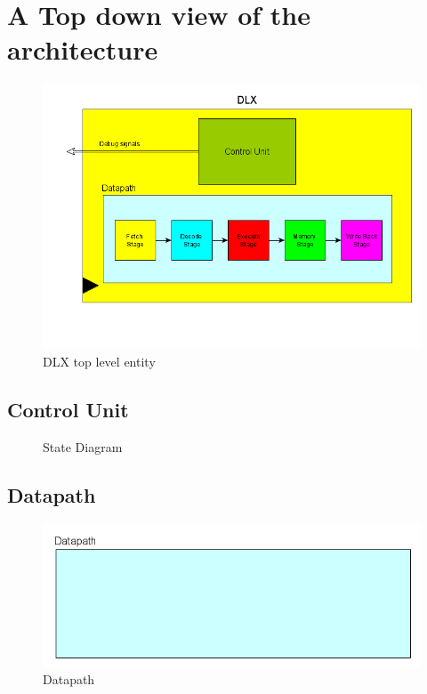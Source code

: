 \chapter{A Top down view of the architecture}
\label{architecure}




\begin{figure}[!htbp]
\centering
\captionsetup{justification=centering}
\includegraphics[scale=0.4,angle=0]{./chapters/figures/dlx_top.png}
\caption{DLX top level entity}
\label{fig:dlxarch}
\end{figure}


\section{Control Unit}



\begin{figure}[!htbp]
\centering
\captionsetup{justification=centering}
\caption{State Diagram}
\label{fig:statediag}
\end{figure}


\section{Datapath}



\begin{figure}[!htbp]
\centering
\captionsetup{justification=centering}
\includegraphics[scale=0.4,angle=0]{./chapters/figures/datapath.png}
\caption{Datapath}
\label{fig:dp}
\end{figure}